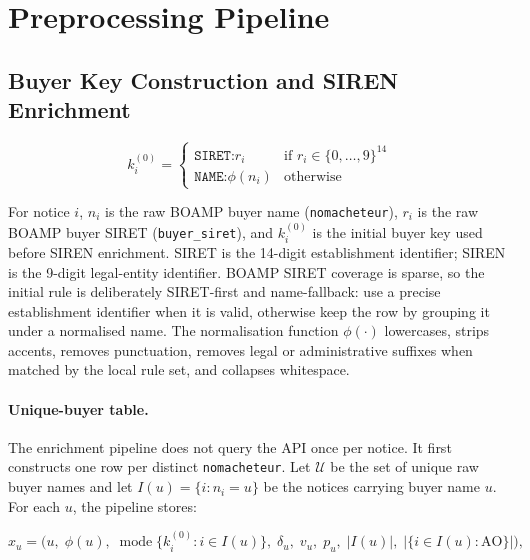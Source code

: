 \documentclass[12pt, a4paper]{article}
\begin{document}
\section{Preprocessing Pipeline}

\subsection{Buyer Key Construction and SIREN Enrichment}
\label{sec:siren_enrichment}

\begin{equation}
  k_i^{(0)} =
  \begin{cases}
    \texttt{SIRET:} r_i & \text{if } r_i \in \{0,\ldots,9\}^{14} \\
    \texttt{NAME:} \phi(n_i) & \text{otherwise}
  \end{cases}
\end{equation}

For notice $i$, $n_i$ is the raw BOAMP buyer name
(\texttt{nomacheteur}), $r_i$ is the raw BOAMP buyer SIRET
(\texttt{buyer\_siret}), and $k_i^{(0)}$ is the initial buyer key used before
SIREN enrichment. SIRET is the 14-digit establishment identifier; SIREN is the
9-digit legal-entity identifier. BOAMP SIRET coverage is sparse, so the initial
rule is deliberately SIRET-first and name-fallback: use a precise establishment
identifier when it is valid, otherwise keep the row by grouping it under a
normalised name. The normalisation function $\phi(\cdot)$ lowercases, strips
accents, removes punctuation, removes legal or administrative suffixes when
matched by the local rule set, and collapses whitespace.

\paragraph{Unique-buyer table.}
The enrichment pipeline does not query the API once per notice. It first
constructs one row per distinct \texttt{nomacheteur}. Let
$\mathcal{U}$ be the set of unique raw buyer names and let
$I(u)=\{i:n_i=u\}$ be the notices carrying buyer name $u$. For each $u$, the
pipeline stores:

\begin{equation}
  x_u =
  \bigl(
    u,\; \phi(u),\; \operatorname{mode}\{k_i^{(0)}:i\in I(u)\},\;
    \delta_u,\; v_u,\; p_u,\; |I(u)|,\; |\{i\in I(u):\text{AO}\}|
  \bigr),
\end{equation}
\end{document}

